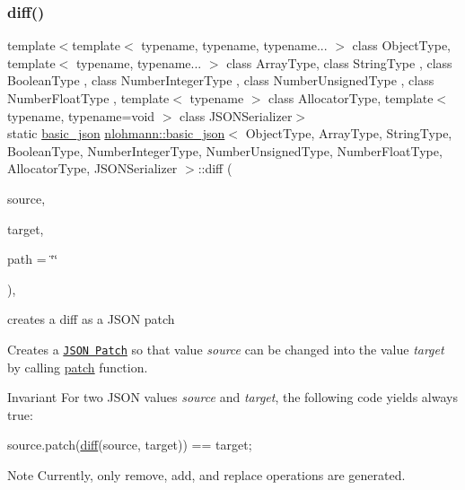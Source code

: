 \subsubsection{\texorpdfstring{diff()}{diff()}}
{\footnotesize\ttfamily template$<$template$<$ typename, typename, typename... $>$ class Object\+Type, template$<$ typename, typename... $>$ class Array\+Type, class String\+Type , class Boolean\+Type , class Number\+Integer\+Type , class Number\+Unsigned\+Type , class Number\+Float\+Type , template$<$ typename $>$ class Allocator\+Type, template$<$ typename, typename=void $>$ class J\+S\+O\+N\+Serializer$>$ \\
static \hyperlink{classnlohmann_1_1basic__json}{basic\+\_\+json} \hyperlink{classnlohmann_1_1basic__json}{nlohmann\+::basic\+\_\+json}$<$ Object\+Type, Array\+Type, String\+Type, Boolean\+Type, Number\+Integer\+Type, Number\+Unsigned\+Type, Number\+Float\+Type, Allocator\+Type, J\+S\+O\+N\+Serializer $>$\+::diff (\begin{DoxyParamCaption}\item[{const \hyperlink{classnlohmann_1_1basic__json}{basic\+\_\+json}$<$ Object\+Type, Array\+Type, String\+Type, Boolean\+Type, Number\+Integer\+Type, Number\+Unsigned\+Type, Number\+Float\+Type, Allocator\+Type, J\+S\+O\+N\+Serializer $>$ \&}]{source,  }\item[{const \hyperlink{classnlohmann_1_1basic__json}{basic\+\_\+json}$<$ Object\+Type, Array\+Type, String\+Type, Boolean\+Type, Number\+Integer\+Type, Number\+Unsigned\+Type, Number\+Float\+Type, Allocator\+Type, J\+S\+O\+N\+Serializer $>$ \&}]{target,  }\item[{const std\+::string \&}]{path = {\ttfamily \char`\"{}\char`\"{}} }\end{DoxyParamCaption})\hspace{0.3cm}{\ttfamily [inline]}, {\ttfamily [static]}}



creates a diff as a J\+S\+ON patch 

Creates a \href{http://jsonpatch.com}{\tt J\+S\+ON Patch} so that value {\itshape source} can be changed into the value {\itshape target} by calling \hyperlink{classnlohmann_1_1basic__json_a81e0c41a4a9dff4df2f6973f7f8b2a83}{patch} function.

\begin{DoxyInvariant}{Invariant}
For two J\+S\+ON values {\itshape source} and {\itshape target}, the following code yields always {\ttfamily true}\+: 
\begin{DoxyCode}
source.patch(\hyperlink{classnlohmann_1_1basic__json_a543bd5f7490de54c875b2c0912dc9a49}{diff}(source, target)) == target;
\end{DoxyCode}

\end{DoxyInvariant}
\begin{DoxyNote}{Note}
Currently, only {\ttfamily remove}, {\ttfamily add}, and {\ttfamily replace} operations are generated.
\end{DoxyNote}


